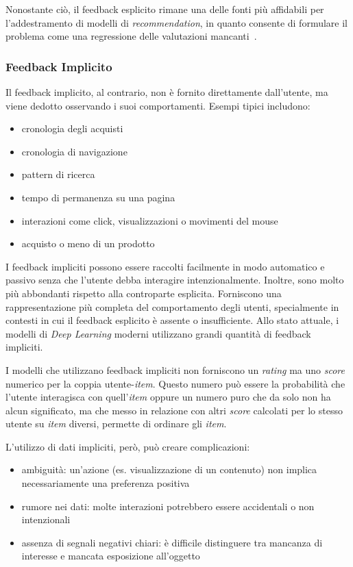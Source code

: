 Nonostante ciò, il feedback esplicito rimane una delle fonti più affidabili per l'addestramento di modelli di \textit{recommendation}, in quanto consente di formulare il problema come una regressione delle valutazioni mancanti~\cite{Implicit_feedback}.

\subsubsection{Feedback Implicito}

Il feedback implicito, al contrario, non è fornito direttamente dall'utente, ma viene dedotto osservando i suoi comportamenti. Esempi tipici includono:

\begin{itemize}
    \item cronologia degli acquisti
    \item cronologia di navigazione
    \item pattern di ricerca
    \item tempo di permanenza su una pagina
    \item interazioni come click, visualizzazioni o movimenti del mouse
    \item acquisto o meno di un prodotto
\end{itemize}

I feedback impliciti possono essere raccolti facilmente in modo automatico e passivo senza che l'utente debba interagire intenzionalmente. Inoltre, sono molto più abbondanti rispetto alla controparte esplicita. Forniscono una rappresentazione più completa del comportamento degli utenti, specialmente in contesti in cui il feedback esplicito è assente o insufficiente. Allo stato attuale, i modelli di \textit{Deep Learning} moderni utilizzano grandi quantità di feedback impliciti. 

I modelli che utilizzano feedback impliciti non forniscono un \textit{rating} ma uno \textit{score} numerico per la coppia utente-\textit{item}. Questo numero può essere la probabilità che l'utente interagisca con quell'\textit{item} oppure un numero puro che da solo non ha alcun significato, ma che messo in relazione con altri \textit{score} calcolati per lo stesso utente su \textit{item} diversi, permette di ordinare gli \textit{item}.

L'utilizzo di dati impliciti, però, può creare complicazioni:

\begin{itemize}
    \item ambiguità: un'azione (es. visualizzazione di un contenuto) non implica necessariamente una preferenza positiva
    \item rumore nei dati: molte interazioni potrebbero essere accidentali o non intenzionali
    \item assenza di segnali negativi chiari: è difficile distinguere tra mancanza di interesse e mancata esposizione all'oggetto
\end{itemize}

